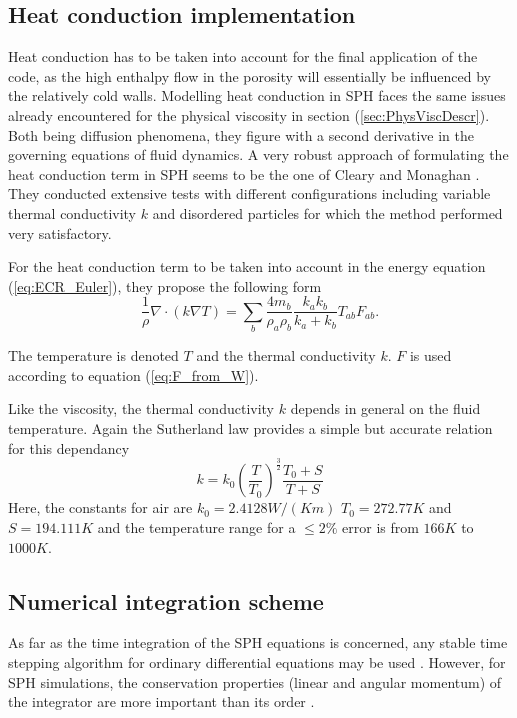 \documentclass{report}
\begin{document}
\subsection{Heat conduction implementation}
\label{sec:HeatCondImplementation}
Heat conduction has to be taken into account for the final application of the code, as the high enthalpy flow in the porosity will essentially be influenced by the relatively cold walls. 
Modelling heat conduction in SPH faces the same issues already encountered for the physical viscosity  in section (\ref{sec:PhysViscDescr}). Both being diffusion phenomena, they figure with a second derivative in the governing equations of fluid dynamics. 
A very robust approach of formulating the heat conduction term in SPH seems to be the one of Cleary and Monaghan \cite{Cleary1999}. They conducted extensive tests with different configurations including variable thermal conductivity $k$ and disordered particles for which the method performed very satisfactory.

For the heat conduction term to be taken into account in the energy equation (\ref{eq:ECR_Euler}), they propose the following form
\begin{equation}
 \label{eq:heatConductionTerm}
\frac{1}{\rho}\nabla \cdot (k \nabla T)=\sum_b\frac{4 m_b}{\rho_a \rho_b} \frac{k_a k_b}{k_a + k_b} T_{ab} F_{ab}.
\end{equation}

The temperature is denoted $T$ and the thermal conductivity $k$. $F$ is used according to equation (\ref{eq:F_from_W}). 

Like the viscosity, the thermal conductivity $k$ depends in general on the fluid temperature. Again the Sutherland law provides a simple but accurate relation for this dependancy \cite{White1974}
\begin{equation}
k=k_0 \left(\frac{T}{T_0}\right)^{\frac{3}{2}}\frac{T_0+S}{T+S}
\end{equation}
Here, the constants for air are $k_0=2.4128W/(K m)$ $T_0=272.77K$ and $S=194.111K$ and the temperature range for a  $\leq2\%$ error is from $166K$ to $1000K$. 



\subsection{Numerical integration scheme}
\label{sec:numIntegr}

As far as the time integration of the SPH equations is concerned, any stable
time stepping algorithm for ordinary differential equations may be
used \cite{Monaghan2005}. However, for SPH simulations, the conservation properties
(linear and angular momentum) of the integrator are more important than its
order \cite{Monaghan2005}.
\end{document}
